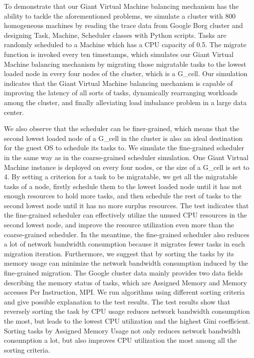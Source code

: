 \begin{bigabstract}
To demonstrate that our Giant Virtual Machine balancing mechanism has the ability to tackle the aforementioned problems, we simulate a cluster with 800 homogeneous machines by reading the trace data from Google Borg cluster and designing Task, Machine, Scheduler classes with Python scripts. Tasks are randomly scheduled to a Machine which has a CPU capacity of 0.5. The migrate function is invoked every ten timestamps, which simulates our Giant Virtual Machine balancing mechanism by migrating those migratable tasks to the lowest loaded node in every four nodes of the cluster, which is a G\_cell. Our simulation indicates that the Giant Virtual Machine balancing mechanism is capable of improving the latency of all sorts of tasks, dynamically rearranging workloads among the cluster, and finally alleviating load imbalance problem in a large data center.

We also observe that the scheduler can be finer-grained, which means that the second lowest loaded node of a G\_cell in the cluster is also an ideal destination for the guest OS to schedule its tasks to. We simulate the fine-grained scheduler in the same way as in the coarse-grained scheduler simulation. One Giant Virtual Machine instance is deployed on every four nodes, or the size of a G\_cell is set to 4. By setting a criterion for a task to be migratable, we get all the migratable tasks of a node, firstly schedule them to the lowest loaded node until it has not enough resources to hold more tasks, and then schedule the rest of tasks to the second lowest node until it has no more surplus resources. The test indicates that the fine-grained scheduler can effectively utilize the unused CPU resources in the second lowest node, and improve the resource utilization even more than the coarse-grained scheduler. In the meantime, the fine-grained scheduler also reduces a lot of network bandwidth consumption because it migrates fewer tasks in each migration iteration. Furthermore, we suggest that by sorting the tasks by its memory usage can minimize the network bandwidth consumption induced by the fine-grained migration. The Google cluster data mainly provides two data fields describing the memory status of tasks, which are Assigned Memory and Memory accesses Per Instruction, MPI. We run algorithms using different sorting criteria and give possible explanation to the test results. The test results show that reversely sorting the task by CPU usage reduces network bandwidth consumption the most, but leads to the lowest CPU utilization and the highest Gini coefficient. Sorting tasks by Assigned Memory Usage not only reduces network bandwidth consumption a lot, but also improves CPU utilization the most among all the sorting criteria. 

\end{bigabstract}